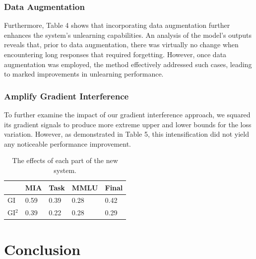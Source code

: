 \documentclass[11pt]{article}
\begin{document}
\subsubsection{Data Augmentation} 
Furthermore, Table 4 shows that incorporating data augmentation further enhances the system’s unlearning capabilities. An analysis of the model’s outputs reveals that, prior to data augmentation, there was virtually no change when encountering long responses that required forgetting. However, once data augmentation was employed, the method effectively addressed such cases, leading to marked improvements in unlearning performance.

\subsubsection{Amplify Gradient Interference} 
To further examine the impact of our gradient interference approach, we squared its gradient signals to produce more extreme upper and lower bounds for the loss variation. However, as demonstrated in Table 5, this intensification did not yield any noticeable performance improvement.

\begin{table}[h]\footnotesize
  \centering
    \begin{tabular}{l|l|l|l|l}
    \hline
        ~ & MIA & Task & MMLU & Final \\ \hline
        GI & 0.59 & 0.39 & 0.28 & 0.42 \\ \hline
        GI$^2$ & 0.39 & 0.22 & 0.28 & 0.29 \\ \hline
    \end{tabular}
  \caption{The effects of each part of the new system.}
  \label{tab:accents}
\end{table}





\section{Conclusion} 
%
\end{document}
